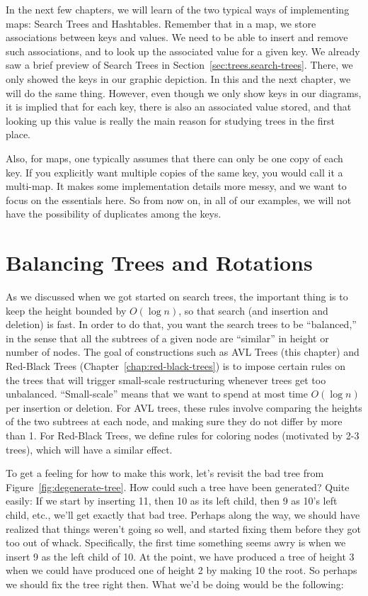 \newcommand{\Leaf}{\Tcircle[fillstyle=solid,fillcolor=black]{\phantom{.}}}

In the next few chapters, we will learn of the two typical ways of
implementing maps: Search Trees and Hashtables.
Remember that in a map, we store associations between keys and values.
We need to be able to insert and remove such associations, and to look
up the associated value for a given key.
We already saw a brief preview of Search Trees in Section~\ref{sec:trees.search-trees}.
There, we only showed the keys in our graphic depiction.
In this and the next chapter, we will do the same thing. 
However, even though we only show keys in our diagrams, it is implied
that for each key, there is also an associated value stored, and that
looking up this value is really the main reason for studying trees in
the first place.

Also, for maps, one typically assumes that there can only be one copy
of each key. If you explicitly want multiple copies of the same key,
you would call it a multi-map. It makes some implementation details
more messy, and we want to focus on the essentials here. So from now
on, in all of our examples, we will not have the possibility of
duplicates among the keys.

\section{Balancing Trees and Rotations}
As we discussed when we got started on search trees, the important
thing is to keep the height bounded by $O(\log n)$, so that search
(and insertion and deletion) is fast. In order to do that, you want
the search trees to be ``balanced,'' in the sense that all the
subtrees of a given node are ``similar'' in height or number of nodes.
The goal of constructions such as AVL Trees (this chapter) and
Red-Black Trees (Chapter~\ref{chap:red-black-trees}) is to 
impose certain rules on the trees that will trigger small-scale
restructuring whenever trees get too unbalanced. 
``Small-scale'' means that we want to spend at most 
time $O(\log n)$ per insertion or deletion.
For AVL trees, these rules involve comparing the heights of the two
subtrees at each node, and making sure they do not differ by more than 1. 
For Red-Black Trees, we define rules for coloring nodes (motivated by
2-3 trees), which will have a similar effect.

To get a feeling for how to make this work, let's revisit the bad tree
from Figure~\ref{fig:degenerate-tree}. 
How could such a tree have been generated?
Quite easily: If we start by inserting 11, then 10 as its left child,
then 9 as 10's left child, etc., we'll get exactly that bad tree.
Perhaps along the way, we should have realized that things weren't
going so well, and started fixing them before they got too out of
whack. Specifically, the first time something seems awry is when we
insert 9 as the left child of 10. At the point, we have produced a
tree of height 3 when we could have produced one of height 2 by making
10 the root. So perhaps we should fix the tree right then.
What we'd be doing would be the following:

